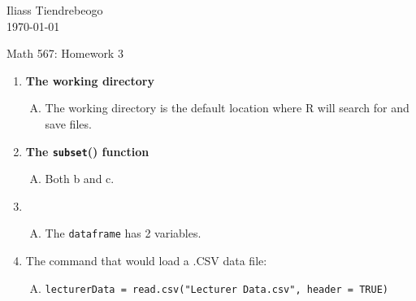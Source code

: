 \documentclass{article}[12pt]
\begin{document}
\hfill Iliass Tiendrebeogo\\

\hfill \today\\

\bigskip

\begin{center}
  \begin{Large}
    Math 567: Homework 3 \\
    
   
  \end{Large}
\end{center} 


\begin{enumerate}[1.]
\item  %
{\bf The working directory }
 \begin{enumerate}[A.]
 \item 
The working directory is the default location where R will search for and save files.
\end{enumerate}
\item %
{\bf The \texttt{subset}() function }
 \begin{enumerate}[D.]
 \item 
  Both b and c.
  \end{enumerate}

\item %

 \begin{enumerate}[C.]
 \item 
  The \texttt{dataframe} has 2 variables.
  \end{enumerate}

\item %
The command that would load a .CSV data file:
 \begin{enumerate}[B.]
 \item 
  \texttt{lecturerData = read.csv("Lecturer Data.csv", header = TRUE) }
  \end{enumerate}

\end{enumerate}
\end{document}
